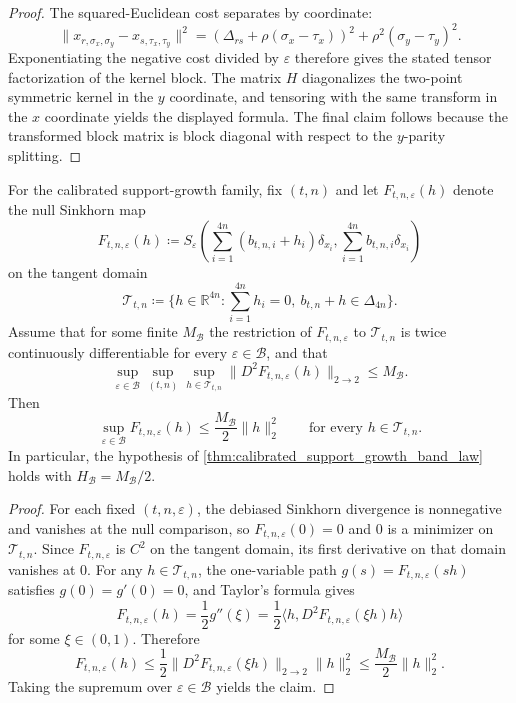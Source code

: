 \begin{proof}
The squared-Euclidean cost separates by coordinate:
\[
  \|x_{r,\sigma_x,\sigma_y}-x_{s,\tau_x,\tau_y}\|^2
  = (\Delta_{rs}+\rho(\sigma_x-\tau_x))^2 + \rho^2(\sigma_y-\tau_y)^2.
\]
Exponentiating the negative cost divided by $\varepsilon$ therefore gives the
stated tensor factorization of the kernel block. The matrix $H$ diagonalizes the
two-point symmetric kernel in the $y$ coordinate, and tensoring with the same
transform in the $x$ coordinate yields the displayed formula. The final claim
follows because the transformed block matrix is block diagonal with respect to
the $y$-parity splitting.
\end{proof}

\begin{lemma}
\label{lem:sinkhorn_quadratic_null_hessian}
For the calibrated support-growth family, fix $(t,n)$ and let
$F_{t,n,\varepsilon}(h)$ denote the null Sinkhorn map
\[
  F_{t,n,\varepsilon}(h)
  \coloneqq
  S_{\varepsilon}\!\left(
    \sum_{i=1}^{4n}(b_{t,n,i}+h_i)\delta_{x_i},
    \sum_{i=1}^{4n} b_{t,n,i}\delta_{x_i}
  \right)
\]
on the tangent domain
\[
  \mathcal T_{t,n}
  \coloneqq
  \{h\in\mathbb R^{4n}: \sum_{i=1}^{4n} h_i = 0,\ b_{t,n}+h\in\Delta_{4n}\}.
\]
Assume that for some finite $M_{\mathcal B}$ the restriction of
$F_{t,n,\varepsilon}$ to $\mathcal T_{t,n}$ is twice continuously
differentiable for every $\varepsilon\in\mathcal B$, and that
\[
  \sup_{\varepsilon\in\mathcal B}
  \sup_{(t,n)}
  \sup_{h\in\mathcal T_{t,n}}
  \bigl\|D^2F_{t,n,\varepsilon}(h)\bigr\|_{2\to 2}
  \le M_{\mathcal B}.
\]
Then
\[
  \sup_{\varepsilon\in\mathcal B}
  F_{t,n,\varepsilon}(h)
  \le \frac{M_{\mathcal B}}{2}\|h\|_2^2
  \qquad \text{for every } h\in\mathcal T_{t,n}.
\]
In particular, the hypothesis of
\cref{thm:calibrated_support_growth_band_law} holds with
$H_{\mathcal B}=M_{\mathcal B}/2$.
\end{lemma}

\begin{proof}
For each fixed $(t,n,\varepsilon)$, the debiased Sinkhorn divergence is
nonnegative and vanishes at the null comparison, so $F_{t,n,\varepsilon}(0)=0$
and $0$ is a minimizer on $\mathcal T_{t,n}$. Since
$F_{t,n,\varepsilon}$ is $C^2$ on the tangent domain, its first derivative on
that domain vanishes at $0$. For any $h\in\mathcal T_{t,n}$, the one-variable
path $g(s)=F_{t,n,\varepsilon}(sh)$ satisfies $g(0)=g'(0)=0$, and Taylor's
formula gives
\[
  F_{t,n,\varepsilon}(h)
  = \frac12 g''(\xi)
  = \frac12\langle h, D^2F_{t,n,\varepsilon}(\xi h)h\rangle
\]
for some $\xi\in(0,1)$. Therefore
\[
  F_{t,n,\varepsilon}(h)
  \le \frac12
  \bigl\|D^2F_{t,n,\varepsilon}(\xi h)\bigr\|_{2\to 2}\|h\|_2^2
  \le \frac{M_{\mathcal B}}{2}\|h\|_2^2.
\]
Taking the supremum over $\varepsilon\in\mathcal B$ yields the claim.
\end{proof}

